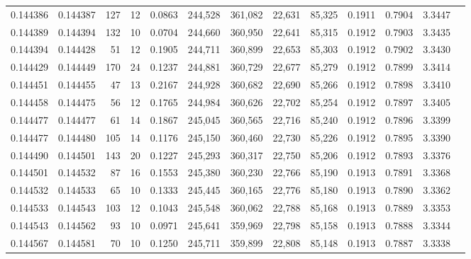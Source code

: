 \begin{tabular}{rrrrrrrrrrrrr}
0.144386 & 0.144387 &   127 &  12 &                                     0.0863 & 244,528 & 361,082 &  22,631 &  85,325 & 0.1911 & 0.7904 & 3.3447 \\
0.144389 & 0.144394 &   132 &  10 &                                     0.0704 & 244,660 & 360,950 &  22,641 &  85,315 & 0.1912 & 0.7903 & 3.3435 \\
0.144394 & 0.144428 &    51 &  12 &                                     0.1905 & 244,711 & 360,899 &  22,653 &  85,303 & 0.1912 & 0.7902 & 3.3430 \\
0.144429 & 0.144449 &   170 &  24 &                                     0.1237 & 244,881 & 360,729 &  22,677 &  85,279 & 0.1912 & 0.7899 & 3.3414 \\
0.144451 & 0.144455 &    47 &  13 &                                     0.2167 & 244,928 & 360,682 &  22,690 &  85,266 & 0.1912 & 0.7898 & 3.3410 \\
0.144458 & 0.144475 &    56 &  12 &                                     0.1765 & 244,984 & 360,626 &  22,702 &  85,254 & 0.1912 & 0.7897 & 3.3405 \\
0.144477 & 0.144477 &    61 &  14 &                                     0.1867 & 245,045 & 360,565 &  22,716 &  85,240 & 0.1912 & 0.7896 & 3.3399 \\
0.144477 & 0.144480 &   105 &  14 &                                     0.1176 & 245,150 & 360,460 &  22,730 &  85,226 & 0.1912 & 0.7895 & 3.3390 \\
0.144490 & 0.144501 &   143 &  20 &                                     0.1227 & 245,293 & 360,317 &  22,750 &  85,206 & 0.1912 & 0.7893 & 3.3376 \\
0.144501 & 0.144532 &    87 &  16 &                                     0.1553 & 245,380 & 360,230 &  22,766 &  85,190 & 0.1913 & 0.7891 & 3.3368 \\
0.144532 & 0.144533 &    65 &  10 &                                     0.1333 & 245,445 & 360,165 &  22,776 &  85,180 & 0.1913 & 0.7890 & 3.3362 \\
0.144533 & 0.144543 &   103 &  12 &                                     0.1043 & 245,548 & 360,062 &  22,788 &  85,168 & 0.1913 & 0.7889 & 3.3353 \\
0.144543 & 0.144562 &    93 &  10 &                                     0.0971 & 245,641 & 359,969 &  22,798 &  85,158 & 0.1913 & 0.7888 & 3.3344 \\
0.144567 & 0.144581 &    70 &  10 &                                     0.1250 & 245,711 & 359,899 &  22,808 &  85,148 & 0.1913 & 0.7887 & 3.3338 \\

\end{tabular}
